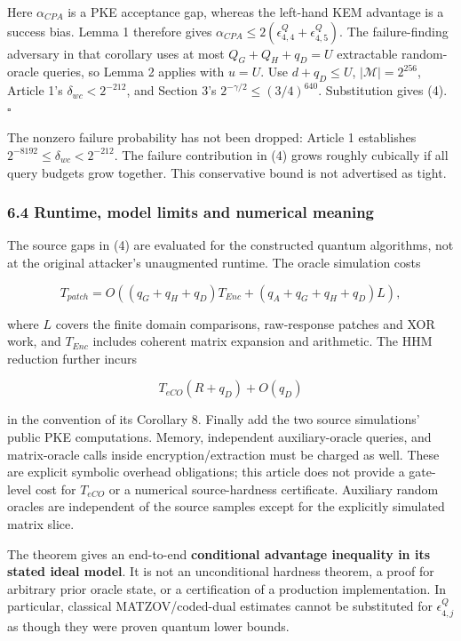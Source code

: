 \documentclass[11pt,a4paper]{article}
\begin{document}
Here \(\alpha_{CPA}\) is a PKE acceptance gap, whereas the left-hand KEM advantage is a success bias. Lemma 1 therefore gives \(\alpha_{CPA}\le2(\epsilon_{4,4}^{Q}+\epsilon_{4,5}^{Q})\). The failure-finding adversary in that corollary uses at most \(Q_G+Q_H+q_D=U\) extractable random-oracle queries, so Lemma 2 applies with \(u=U\). Use \(d+q_D\le U\), \(|\mathcal M|=2^{256}\), Article 1's \(\delta_{wc}<2^{-212}\), and Section 3's \(2^{-\gamma/2}\le(3/4)^{640}\). Substitution gives (4). \(\square\)

The nonzero failure probability has not been dropped: Article 1 establishes \(2^{-8192}\le\delta_{wc}<2^{-212}\). The failure contribution in (4) grows roughly cubically if all query budgets grow together. This conservative bound is not advertised as tight.

\subsubsection{6.4 Runtime, model limits and numerical meaning}\label{runtime-model-limits-and-numerical-meaning}

The source gaps in (4) are evaluated for the constructed quantum algorithms, not at the original attacker's unaugmented runtime. The oracle simulation costs

\[
T_{patch}=O((q_G+q_H+q_D)T_{Enc}
+(q_A+q_G+q_H+q_D)L),
\]

where \(L\) covers the finite domain comparisons, raw-response patches and XOR work, and \(T_{Enc}\) includes coherent matrix expansion and arithmetic. The HHM reduction further incurs

\[
T_{eCO}(R+q_D)+O(q_D)
\]

in the convention of its Corollary 8. Finally add the two source simulations' public PKE computations. Memory, independent auxiliary-oracle queries, and matrix-oracle calls inside encryption/extraction must be charged as well. These are explicit symbolic overhead obligations; this article does not provide a gate-level cost for \(T_{eCO}\) or a numerical source-hardness certificate. Auxiliary random oracles are independent of the source samples except for the explicitly simulated matrix slice.

The theorem gives an end-to-end \textbf{conditional advantage inequality in its stated ideal model}. It is not an unconditional hardness theorem, a proof for arbitrary prior oracle state, or a certification of a production implementation. In particular, classical MATZOV/coded-dual estimates cannot be substituted for \(\epsilon_{4,j}^{Q}\) as though they were proven quantum lower bounds.
\end{document}
